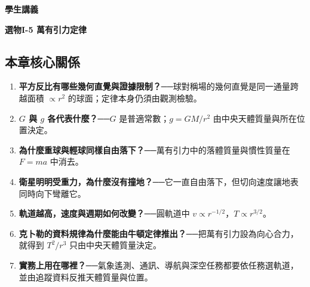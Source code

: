\documentclass[11pt,a4paper]{article}
\providecommand{\tightlist}{%
  \setlength{\itemsep}{0pt}\setlength{\parskip}{0pt}}
\begin{document}
\begin{tcolorbox}[
  enhanced,colback=white,colframe=HandoutBlue,boxrule=1.1pt,arc=2mm,
  borderline west={3pt}{0pt}{HandoutBlue},left=5mm,right=4mm,top=4mm,bottom=4mm
]
{\sffamily\small\bfseries\color{HandoutBlue}學生講義}\par
{\sffamily\bfseries\LARGE\color{HandoutInk}選物I-5 萬有引力定律}\par
\vspace{0.35em}{\large 同一條平方反比定律，解釋地表落體、衛星軌道與行星週期}\par
{}\par
{}\par
\end{tcolorbox}


\begin{HandoutLearningMap}

\subsection{本章核心關係}\label{ux672cux7ae0ux6838ux5fc3ux95dcux4fc2}

\begin{enumerate}
\def\labelenumi{\arabic{enumi}.}
\tightlist
\item
  \textbf{平方反比有哪些幾何直覺與證據限制？}──球對稱場的幾何直覺是同一通量跨越面積 \(\propto r^2\) 的球面；定律本身仍須由觀測檢驗。
\item
  \textbf{\(G\) 與 \(g\) 各代表什麼？}──\(G\) 是普適常數；\(g=GM/r^2\) 由中央天體質量與所在位置決定。
\item
  \textbf{為什麼重球與輕球同樣自由落下？}──萬有引力中的落體質量與慣性質量在 \(F=ma\) 中消去。
\item
  \textbf{衛星明明受重力，為什麼沒有撞地？}──它一直自由落下，但切向速度讓地表同時向下彎離它。
\item
  \textbf{軌道越高，速度與週期如何改變？}──圓軌道中 \(v\propto r^{-1/2}\)，\(T\propto r^{3/2}\)。
\item
  \textbf{克卜勒的資料規律為什麼能由牛頓定律推出？}──把萬有引力設為向心合力，就得到 \(T^2/r^3\) 只由中央天體質量決定。
\item
  \textbf{實務上用在哪裡？}──氣象遙測、通訊、導航與深空任務都要依任務選軌道，並由追蹤資料反推天體質量與位置。
\end{enumerate}

\end{HandoutLearningMap}
\end{document}
